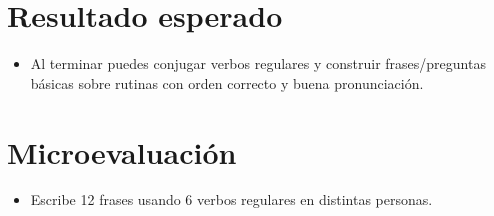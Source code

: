 \section{Resultado esperado}
\begin{itemize}[leftmargin=*]
	\item Al terminar puedes conjugar verbos regulares y construir frases/preguntas básicas sobre rutinas con orden correcto y buena pronunciación.
\end{itemize}

\section{Microevaluación}
\begin{itemize}[leftmargin=*]
	\item Escribe 12 frases usando 6 verbos regulares en distintas personas.
\end{itemize}
